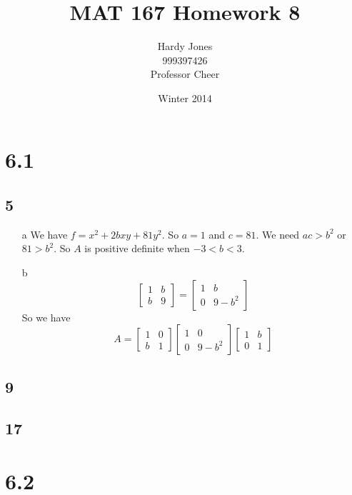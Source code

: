 \documentclass[12pt,letterpaper]{article}
\title{MAT 167 Homework 8\vspace{-2ex}}
\author{Hardy Jones\\
        999397426\\
        Professor Cheer\vspace{-2ex}}
\date{Winter 2014}
\begin{document}
  \maketitle

  \section*{6.1}
    \subsection*{5}
      \begin{enumerate}
        \item[a]
          We have $f = x^2 + 2bxy + 81y^2$.
          So $a = 1$ and $c = 81$.
          We need $ac > b^2$ or $81 > b^2$.
          So $A$ is positive definite when $-3 < b < 3$.
        \item[b]
          \[
            \begin{bmatrix}
              1 & b \\
              b & 9
            \end{bmatrix}
            =
            \begin{bmatrix}
              1 & b \\
              0 & 9 - b^2
            \end{bmatrix}
          \]
          So we have
          \[
            A = \begin{bmatrix}
              1 & 0 \\
              b & 1
            \end{bmatrix}
            \begin{bmatrix}
              1 & 0 \\
              0 & 9 - b^2
            \end{bmatrix}
            \begin{bmatrix}
              1 & b \\
              0 & 1
            \end{bmatrix}
          \]
      \end{enumerate}
    \subsection*{9}
    \subsection*{17}
  \section*{6.2}
\end{document}
